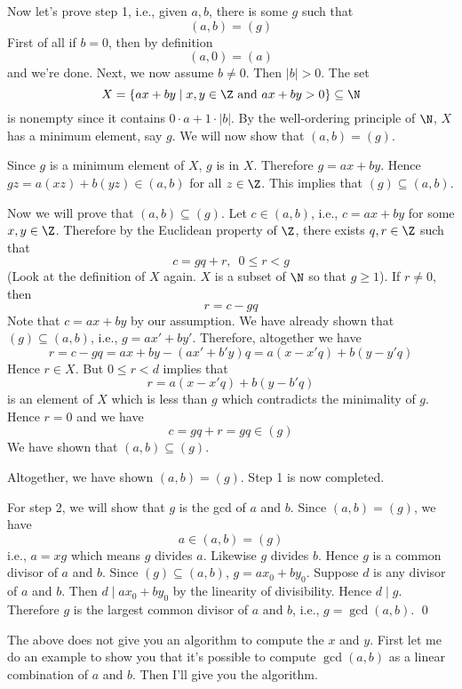 Now let's prove step 1, i.e., given $a,b$, 
there is some $g$ such that
\[
(a, b) = (g)
\]
First of all if $b = 0$, then by definition
\[
(a, 0) = (a)
\]
and we're done.
Next, we now assume $b \neq 0$.
Then $|b| > 0$.
The set
\[
X = \{ax + by \mid x,y \in \Z \text{ and } ax + by > 0 \} \subseteq \N
\]
is nonempty since it contains
$0\cdot a + 1\cdot |b|$.
By the well-ordering principle of $\N$, $X$ has a minimum element, say $g$.
We will now show that $(a, b) = (g)$.

Since $g$ is a minimum element of $X$, $g$ is in $X$.
Therefore $g = ax + by$.
Hence $gz = a(xz) + b(yz) \in (a, b)$ for all $z \in \Z$.
This implies that $(g) \subseteq (a, b)$.

Now we will prove that $(a, b) \subseteq (g)$.
Let $c \in (a, b)$, i.e., $c = ax + by$ for some $x,y \in \Z$.
Therefore by the Euclidean property of $\Z$, there exists $q,r \in \Z$ such that
\[
c = gq + r, \,\,\, 0 \leq r < g
\]
(Look at the definition of $X$ again. $X$ is a subset of $\N$ so that
$g \geq 1$).
If $r \neq 0$, then
\[
r = c - gq
\]
Note that $c = ax + by$ by our assumption.
We have already shown that $(g) \subseteq (a, b)$, i.e., $g = ax' + by'$.
Therefore, altogether we have
\[
r = c - gq = ax + by - (ax' + b'y)q = a(x-x'q) + b(y-y'q)
\]
Hence $r \in X$.
But $0 \leq r < d$ implies that
\[
r = a(x-x'q) + b(y-b'q)
\]
is an element of $X$ which is less than $g$ which contradicts the
minimality of $g$.
Hence $r = 0$ and we have
\[
c = gq + r = gq \in (g)
\]
We have shown that $(a,b) \subseteq (g)$.

Altogether, we have shown $(a,b) = (g)$.
Step 1 is now completed.

For step 2, we will show that $g$ is the gcd of $a$ and $b$.
Since $(a,b) = (g)$, we have
\[
a \in (a,b) = (g)
\]
i.e., $a = xg$ which means $g$ divides $a$.
Likewise $g$ divides $b$.
Hence $g$ is a common divisor of $a$ and $b$.
Since $(g) \subseteq (a, b)$,
$g = ax_0 + by_0$.
Suppose $d$ is any divisor of $a$ and $b$.
Then $d \mid ax_0 + by_0$ by the linearity of divisibility.
Hence $d \mid g$.
Therefore $g$ is the largest common divisor of $a$ and $b$,
i.e., $g = \gcd(a,b)$.
\qed

The above does not give you an algorithm to compute the
$x$ and $y$.
First let me do an example to show you that
it's possible to compute $\gcd(a,b)$ as a linear combination of $a$ and $b$.
Then I'll give you the algorithm.

